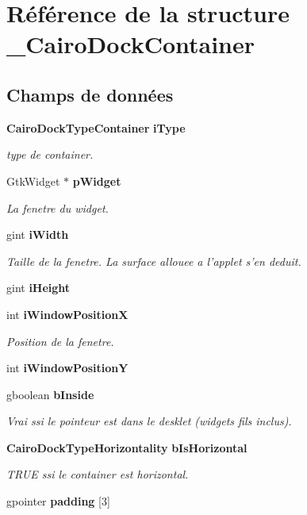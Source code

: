 \section{Référence de la structure \_\-CairoDockContainer}
\label{struct__CairoDockContainer}
\subsection*{Champs de données}
\begin{CompactItemize}
\item 
{\bf CairoDockTypeContainer} {\bf iType}
\begin{CompactList}\small\item\em type de container. \item\end{CompactList}\item 
GtkWidget $\ast$ {\bf pWidget}
\begin{CompactList}\small\item\em La fenetre du widget. \item\end{CompactList}\item 
gint {\bf iWidth}
\begin{CompactList}\small\item\em Taille de la fenetre. La surface allouee a l'applet s'en deduit. \item\end{CompactList}\item 
gint {\bf iHeight}
\item 
int {\bf iWindowPositionX}
\begin{CompactList}\small\item\em Position de la fenetre. \item\end{CompactList}\item 
int {\bf iWindowPositionY}
\item 
gboolean {\bf bInside}
\begin{CompactList}\small\item\em Vrai ssi le pointeur est dans le desklet (widgets fils inclus). \item\end{CompactList}\item 
{\bf CairoDockTypeHorizontality} {\bf bIsHorizontal}
\begin{CompactList}\small\item\em TRUE ssi le container est horizontal. \item\end{CompactList}\item 
gpointer {\bf padding} [3]
\end{CompactItemize}


